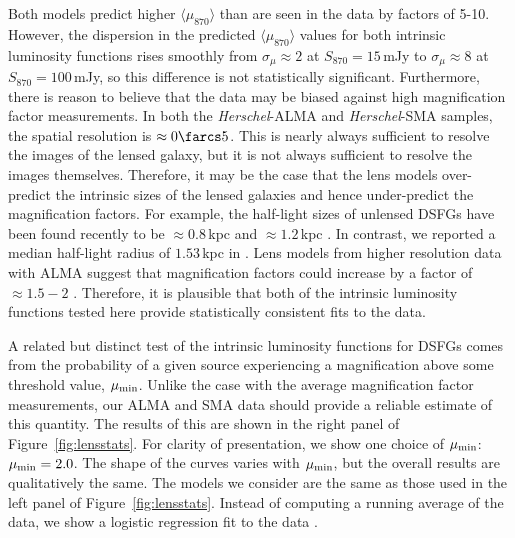 \documentclass[iop]{emulateapj}
\begin{document}

Both models predict higher $\langle\mu_{870}\rangle$ than are seen in the data
by factors of 5-10.  However, the dispersion in the predicted
$\langle\mu_{870}\rangle$ values for both intrinsic luminosity functions rises
smoothly from $\sigma_\mu \approx 2$ at $S_{870} = 15\,$mJy to $\sigma_\mu
\approx 8$ at $S_{870} = 100\,$mJy, so this difference is not statistically
significant.  Furthermore, there is reason to believe that the data may be
biased against high magnification factor measurements.  In both the {\it
Herschel}-ALMA and {\it Herschel}-SMA samples, the spatial resolution is
$\approx 0\farcs5$.  This is nearly always sufficient to resolve the images of
the lensed galaxy, but it is not always sufficient to resolve the images
themselves.  Therefore, it may be the case that the lens models over-predict
the intrinsic sizes of the lensed galaxies and hence under-predict the
magnification factors.  For example, the half-light sizes of unlensed DSFGs
have been found recently to be $\approx 0.8 \,$kpc \citep{Ikarashi:2014nr} and
$\approx1.2\,$kpc \citep{Simpson:2015ty}.  In contrast, we reported a median
half-light radius of $1.53\,$kpc in \citet{Bussmann:2013lr}.  Lens models from
higher resolution data with ALMA suggest that magnification factors could
increase by a factor of $\approx 1.5-2$ \citep{Rybak:2015fk, Tamura:2015lq,
Dye:2015fp}.  Therefore, it is plausible that both of the intrinsic luminosity
functions tested here provide statistically consistent fits to the data.

A related but distinct test of the intrinsic luminosity functions for DSFGs
comes from the probability of a given source experiencing a magnification above
some threshold value, $\mu_{\rm min}$.  Unlike the case with the average
magnification factor measurements, our ALMA and SMA data should provide a
reliable estimate of this quantity.  The results of this are shown in the right
panel of Figure~\ref{fig:lensstats}.  For clarity of presentation, we show one
choice of $\mu_{\rm min}$: $\mu_{\rm min} = 2.0$.  The shape of the curves
varies with  $\mu_{\rm min}$, but the overall results are qualitatively the
same.  The models we consider are the same as those used in the left panel of
Figure~\ref{fig:lensstats}.  Instead of computing a running average of the
data, we show a logistic regression fit to the data \citep[obtained with the
{\sc Scikit-learn} package;][]{scikitlearn}.
\end{document}
